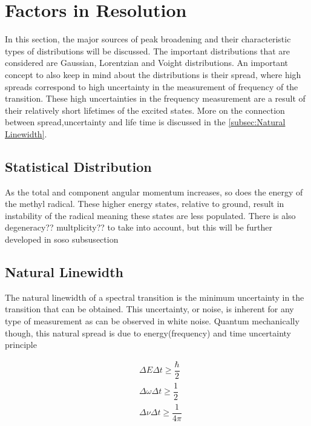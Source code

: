 \documentclass[11pt,a4paper]{book}
\begin{document}
	\section{Factors in Resolution}
		\label{sec:Factors in Resolution}
		In this section, the major sources of peak broadening and their characteristic types of distributions will be discussed. The important distributions that are considered are Gaussian, Lorentzian and Voight distributions. An important concept to also keep in mind about the distributions is their spread, where high spreads correspond to high uncertainty in the measurement of frequency of the transition. These high uncertainties in the frequency measurement are a result of their relatively short lifetimes of the excited states. More on the connection between spread,uncertainty and life time is discussed in the \autoref{subsec:Natural Linewidth}.
		\subsection{Statistical Distribution}
			\label{subsec:Statistical Distribution}
			As the total and component angular momentum increases, so does the energy of the methyl radical. These higher energy states, relative to ground, result in instability of the radical meaning these states are less populated. There is also degeneracy?? multplicity?? to take into account, but this will be further developed in soso subsusection \todo{}\
		\subsection{Natural Linewidth}
			\label{subsec:Natural Linewidth}
			The natural linewidth of a spectral transition is the minimum uncertainty in the transition that can be obtained. This uncertainty, or noise, is inherent for any type of measurement as can be observed in white noise. Quantum mechanically though, this natural spread is due to energy(frequency) and time uncertainty principle
			
			\begin{equation}
				\label{eq:energy(frequency)timeuncertainty}
				\begin{split}
				&\Delta E \Delta t \geq \dfrac{\hbar}{2} \\
				&\Delta \omega \Delta t \geq \dfrac{1}{2} \\
				&\Delta \nu \Delta t \geq \dfrac{1}{4 \pi}
				\end{split}
			\end{equation}
			
\end{document}
